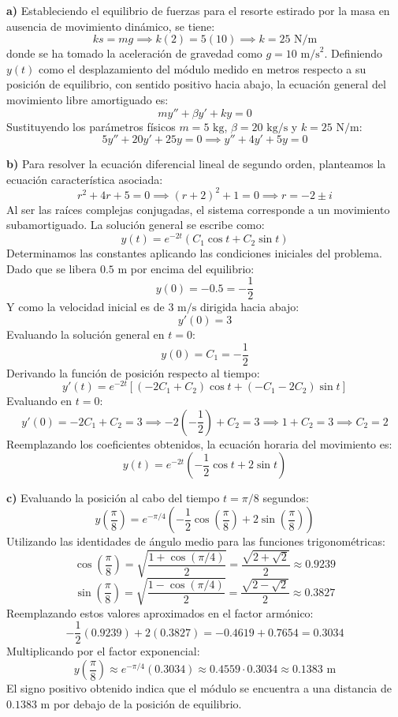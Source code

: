 \documentclass[12pt,letterpaper]{article}
\begin{document}
\medskip

\textbf{a)} Estableciendo el equilibrio de fuerzas para el resorte estirado por la masa en ausencia de movimiento dinámico, se tiene:
\[
  k s = mg \implies k(2) = 5(10) \implies k = 25\text{ N/m}
\]
donde se ha tomado la aceleración de gravedad como $g = 10\text{ m/s}^2$. Definiendo $y(t)$ como el desplazamiento del módulo medido en metros respecto a su posición de equilibrio, con sentido positivo hacia abajo, la ecuación general del movimiento libre amortiguado es:
\[
  my'' + \beta y' + ky = 0
\]
Sustituyendo los parámetros físicos $m = 5\text{ kg}$, $\beta = 20\text{ kg/s}$ y $k = 25\text{ N/m}$:
\[
  5y'' + 20y' + 25y = 0 \implies y'' + 4y' + 5y = 0
\]

\medskip

\textbf{b)} Para resolver la ecuación diferencial lineal de segundo orden, planteamos la ecuación característica asociada:
\[
  r^2 + 4r + 5 = 0 \implies (r+2)^2 + 1 = 0 \implies r = -2 \pm i
\]
Al ser las raíces complejas conjugadas, el sistema corresponde a un movimiento subamortiguado. La solución general se escribe como:
\[
  y(t) = e^{-2t}(C_1 \cos t + C_2 \sin t)
\]
Determinamos las constantes aplicando las condiciones iniciales del problema. Dado que se libera $0.5\text{ m}$ por encima del equilibrio:
\[
  y(0) = -0.5 = -\frac{1}{2}
\]
Y como la velocidad inicial es de $3\text{ m/s}$ dirigida hacia abajo:
\[
  y'(0) = 3
\]
Evaluando la solución general en $t=0$:
\[
  y(0) = C_1 = -\frac{1}{2}
\]
Derivando la función de posición respecto al tiempo:
\[
  y'(t) = e^{-2t}[(-2C_1 + C_2)\cos t + (-C_1 - 2C_2)\sin t]
\]
Evaluando en $t=0$:
\[
  y'(0) = -2C_1 + C_2 = 3 \implies -2\left(-\frac{1}{2}\right) + C_2 = 3 \implies 1 + C_2 = 3 \implies C_2 = 2
\]
Reemplazando los coeficientes obtenidos, la ecuación horaria del movimiento es:
\[
  y(t) = e^{-2t}\left(-\frac{1}{2}\cos t + 2\sin t\right)
\]

\medskip

\textbf{c)} Evaluando la posición al cabo del tiempo $t = \pi/8$ segundos:
\[
  y\left(\frac{\pi}{8}\right) = e^{-\pi/4}\left(-\frac{1}{2}\cos\left(\frac{\pi}{8}\right) + 2\sin\left(\frac{\pi}{8}\right)\right)
\]
Utilizando las identidades de ángulo medio para las funciones trigonométricas:
\[
  \cos\left(\frac{\pi}{8}\right) = \sqrt{\frac{1+\cos(\pi/4)}{2}} = \frac{\sqrt{2+\sqrt{2}}}{2} \approx 0.9239
\]
\[
  \sin\left(\frac{\pi}{8}\right) = \sqrt{\frac{1-\cos(\pi/4)}{2}} = \frac{\sqrt{2-\sqrt{2}}}{2} \approx 0.3827
\]
Reemplazando estos valores aproximados en el factor armónico:
\[
  -\frac{1}{2}(0.9239) + 2(0.3827) = -0.4619 + 0.7654 = 0.3034
\]
Multiplicando por el factor exponencial:
\[
  y\left(\frac{\pi}{8}\right) \approx e^{-\pi/4} (0.3034) \approx 0.4559 \cdot 0.3034 \approx 0.1383\text{ m}
\]
El signo positivo obtenido indica que el módulo se encuentra a una distancia de $0.1383\text{ m}$ por debajo de la posición de equilibrio.
\end{document}
